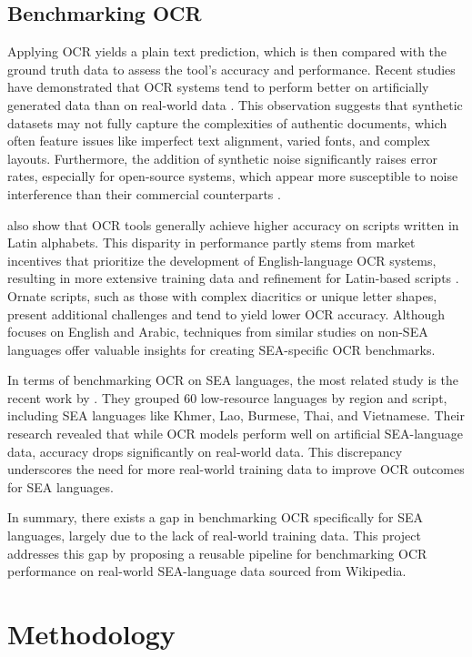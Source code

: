 \documentclass[12pt,oneside]{memoir}
\begin{document}
\section{Benchmarking OCR}
Applying OCR yields a plain text prediction, which is then compared with the ground truth data to assess the tool’s accuracy and performance.
Recent studies have demonstrated that OCR systems tend to perform better on artificially generated data than on real-world data \parencite{ignat-etal-2022}.
This observation suggests that synthetic datasets may not fully capture the complexities of authentic documents, which often feature issues like imperfect text alignment, varied fonts, and complex layouts.
Furthermore, the addition of synthetic noise significantly raises error rates, especially for open-source systems, which appear more susceptible to noise interference than their commercial counterparts \parencite{hegghammer-2022}.

\textcite{ignat-etal-2022} also show that OCR tools generally achieve higher accuracy on scripts written in Latin alphabets.
This disparity in performance partly stems from market incentives that prioritize the development of English-language OCR systems, resulting in more extensive training data and refinement for Latin-based scripts \parencite{hegghammer-2022}. 
Ornate scripts, such as those with complex diacritics or unique letter shapes, present additional challenges and tend to yield lower OCR accuracy.
Although \textcite{hegghammer-2022} focuses on English and Arabic, techniques from similar studies on non-SEA languages offer valuable insights for creating SEA-specific OCR benchmarks.

In terms of benchmarking OCR on SEA languages, the most related study is the recent work by \textcite{ignat-etal-2022}.
They grouped 60 low-resource languages by region and script, including SEA languages like Khmer, Lao, Burmese, Thai, and Vietnamese.
Their research revealed that while OCR models perform well on artificial SEA-language data, accuracy drops significantly on real-world data.
This discrepancy underscores the need for more real-world training data to improve OCR outcomes for SEA languages.

In summary, there exists a gap in benchmarking OCR specifically for SEA languages, largely due to the lack of real-world training data.
This project addresses this gap by proposing a reusable pipeline for benchmarking OCR performance on real-world SEA-language data sourced from Wikipedia.

\chapter{Methodology}
\end{document}
